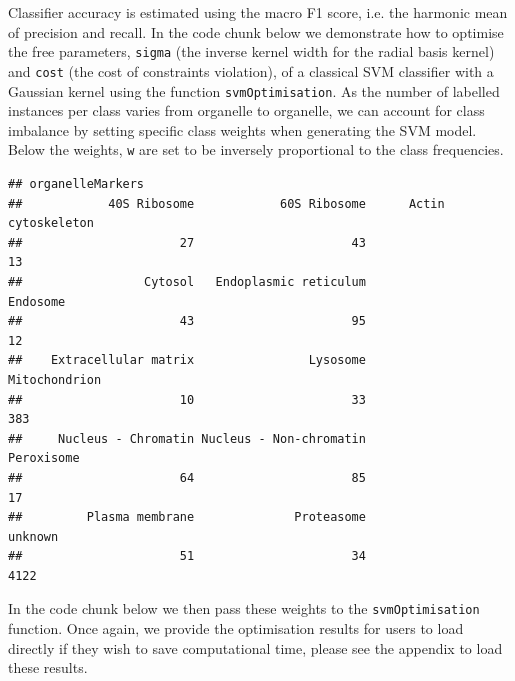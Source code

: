 Classifier accuracy is estimated using the macro F1 score, i.e. the
harmonic mean of precision and recall. In the code chunk below we
demonstrate how to optimise the free parameters, \texttt{sigma} (the
inverse kernel width for the radial basis kernel) and \texttt{cost}
(the cost of constraints violation), of a classical SVM classifier
with a Gaussian kernel using the function \texttt{svmOptimisation}. As
the number of labelled instances per class varies from organelle to
organelle, we can account for class imbalance by setting specific
class weights when generating the SVM model. Below the weights,
\texttt{w} are set to be inversely proportional to the class
frequencies.

\begin{knitrout}
\color{fgcolor}\begin{kframe}
\begin{alltt}
 \hlkwb{<-} \hlstd{(}  \hlstd{=} \hlstd{))}
\end{alltt}
\begin{verbatim}
## organelleMarkers
##            40S Ribosome            60S Ribosome      Actin cytoskeleton 
##                      27                      43                      13 
##                 Cytosol   Endoplasmic reticulum                Endosome 
##                      43                      95                      12 
##    Extracellular matrix                Lysosome           Mitochondrion 
##                      10                      33                     383 
##     Nucleus - Chromatin Nucleus - Non-chromatin              Peroxisome 
##                      64                      85                      17 
##         Plasma membrane              Proteasome                 unknown 
##                      51                      34                    4122
\end{verbatim}
\begin{alltt}
 \hlkwb{<-} \hlopt{/}\hlstd{w[} \hlopt{!=} \hlstd{]}
\end{alltt}
\end{kframe}
\end{knitrout}

In the code chunk below we then pass these weights
to the \texttt{svmOptimisation} function. Once again, we provide
the optimisation results for users to load directly if they wish to save
computational time, please see the appendix to load these results.




